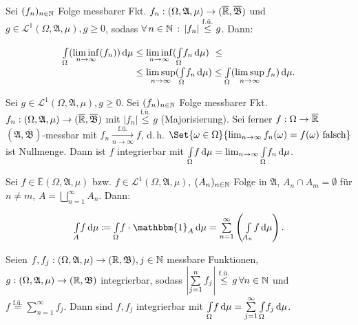 \documentclass{cheat-sheet}
\newcommand{\Alg}{\mathfrak{A}} %
\newcommand{\Bor}{\mathfrak{B}} %
\newcommand{\E}{\mathbb{E}} %
\newcommand{\Leb}{\mathcal{L}} %
\newcommand{\ind}{\mathbbm{1}} %
\newcommand{\fue}{\overset{\text{f.ü.}}} %
\newcommand{\IntOmu}[1]{\Int{\Omega}{}{#1}{\mu}} %
\begin{document}
\vspace{-20pt}

\begin{satz}
  \begin{doublespace}
    Sei $(f_n)_{n \in \mathbb{N}}$ Folge messbarer Fkt. $f_n : (\Omega, \Alg, \mu) \to (\ER, \overline{\Bor})$ und $g \in \Leb^1(\Omega, \Alg, \mu), g \geq 0$, sodass $\forall \, {n \in \mathbb{N}} \,:\, \lvert f_n\rvert \overset{\text{f.ü.}}\leq g$. Dann:\\[-16pt]
  \end{doublespace}
  \begin{align*}
    \IntOmu{(\liminf_{n \to \infty} (f_n))}
    &\leq \liminf_{n \to \infty} (\IntOmu{f_n}) \,\,\leq\\[-5pt]
    &\leq \limsup_{n \to \infty} (\IntOmu{f_n})
    \leq \IntOmu{(\limsup_{n \to \infty} f_n)}.
  \end{align*}
\end{satz}

\begin{satz}\begin{doublespace}
  Sei $g \in \Leb^1(\Omega, \Alg, \mu), g \geq 0$. Sei $(f_n)_{n \in \mathbb{N}}$ Folge messbarer Fkt. $f_n : (\Omega, \Alg, \mu) \to (\ER, \overline{\Bor})$ mit $\left|f_n\right| \overset{\text{f.ü.}}\leq g$ (Majorisierung).
  Sei ferner $f : \Omega \to \overline{\mathbb{R}}$ $(\Alg, \overline{\Bor})$-messbar mit $f_n \xrightarrow[n \to \infty]{\text{f.ü.}} f$, d.\,h. $\Set{ \omega \in \Omega }{ \lim_{n \to \infty} f_n(\omega) = f(\omega) \text{ falsch} }$ ist Nullmenge. Dann ist $f$ integrierbar mit $\IntOmu{f} = \lim_{n \to \infty} \IntOmu{f_n}$.
\end{doublespace}\end{satz}

\vspace{-20pt}

\begin{satz}
  \begin{doublespace}
    Sei $f \in \overline{\E}(\Omega, \Alg, \mu)$ bzw. $f \in \Leb^1(\Omega, \Alg, \mu)$, $(A_n)_{n \in \mathbb{N}}$ Folge in $\Alg$, $A_n \cap A_m = \emptyset$ für $n \not= m$, $A = \bigsqcup_{n=1}^\infty A_n$. Dann:\\[-10pt]
  \end{doublespace}
  \[ \Int{A}{}{f}{\mu} \coloneqq \IntOmu{f \cdot \ind_A} = \sum_{n=1}^\infty \left( \Int{A_n}{}{f}{\mu} \right). \]
\end{satz}

\begin{satz}\begin{doublespace}
  Seien $f, f_j : (\Omega, \Alg, \mu) \to (\R, \Bor), j \in \N$ messbare Funktionen, $g : (\Omega, \Alg, \mu) \to (\R, \Bor)$ integrierbar, sodass $\left|\sum_{j=1}^n f_j\right| \overset{\text{f.ü.}}\leq g \, \forall n \in \N$ und\\[-5pt]
  $f \fue= \sum_{n=1}^\infty f_j$. Dann sind $f, f_j$ integrierbar mit $\IntOmu{f} = \sum_{j=1}^\infty \IntOmu{f_j}$.
\end{doublespace}\end{satz}
\end{document}
